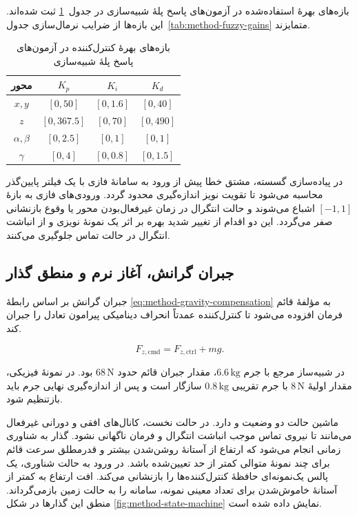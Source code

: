 بازه‌های بهرهٔ استفاده‌شده در آزمون‌های پاسخ پلهٔ شبیه‌سازی در جدول~\ref{tab:method-step-gain-ranges} ثبت شده‌اند. این بازه‌ها از ضرایب نرمال‌سازی جدول~\ref{tab:method-fuzzy-gains} متمایزند.

\begin{table}[!htbp]
	\centering
	\caption{بازه‌های بهرهٔ کنترل‌کننده در آزمون‌های پاسخ پلهٔ شبیه‌سازی}
	\label{tab:method-step-gain-ranges}
	\begin{tabular}{c c c c}
		\hline
		محور & $K_p$ & $K_i$ & $K_d$ \\ \hline
		$x,y$ & $[0,50]$ & $[0,1.6]$ & $[0,40]$ \\
		$z$ & $[0,367.5]$ & $[0,70]$ & $[0,490]$ \\
		$\alpha,\beta$ & $[0,2.5]$ & $[0,1]$ & $[0,1]$ \\
		$\gamma$ & $[0,4]$ & $[0,0.8]$ & $[0,1.5]$ \\ \hline
	\end{tabular}
\end{table}

در پیاده‌سازی گسسته، مشتق خطا پیش از ورود به سامانهٔ فازی با یک فیلتر پایین‌گذر محاسبه می‌شود تا تقویت نویز اندازه‌گیری محدود گردد. ورودی‌های فازی به بازهٔ $[-1,1]$ اشباع می‌شوند و حالت انتگرال در زمان غیرفعال‌بودن محور یا وقوع بازنشانی صفر می‌گردد. این دو اقدام از تغییر شدید بهره بر اثر یک نمونهٔ نویزی و از انباشت انتگرال در حالت تماس جلوگیری می‌کنند.

\subsection{جبران گرانش، آغاز نرم و منطق گذار}
\label{subsec:method-state-machine}

جبران گرانش بر اساس رابطهٔ \ref{eq:method-gravity-compensation} به مؤلفهٔ قائم فرمان افزوده می‌شود تا کنترل‌کننده عمدتاً انحراف دینامیکی پیرامون تعادل را جبران کند.

\begin{equation}
	F_{z,\mathrm{cmd}}=F_{z,\mathrm{ctrl}}+m g.
	\label{eq:method-gravity-compensation}
\end{equation}

در شبیه‌ساز مرجع با جرم $6.6\,\mathrm{kg}$، مقدار جبران قائم حدود $68\,\mathrm N$ بود. در نمونهٔ فیزیکی، مقدار اولیهٔ $8\,\mathrm N$ با جرم تقریبی $0.8\,\mathrm{kg}$ سازگار است و پس از اندازه‌گیری نهایی جرم باید بازتنظیم شود.

ماشین حالت دو وضعیت  و  دارد. در حالت نخست، کانال‌های افقی و دورانی غیرفعال می‌مانند تا نیروی تماس موجب انباشت انتگرال و فرمان ناگهانی نشود. گذار به شناوری زمانی انجام می‌شود که ارتفاع از آستانهٔ روشن‌شدن بیشتر و قدرمطلق سرعت قائم برای چند نمونهٔ متوالی کمتر از حد تعیین‌شده باشد. در ورود به حالت شناوری، یک پالس یک‌نمونه‌ای حافظهٔ کنترل‌کننده‌ها را بازنشانی می‌کند. افت ارتفاع به کمتر از آستانهٔ خاموش‌شدن برای تعداد معینی نمونه، سامانه را به حالت زمین بازمی‌گرداند. منطق این گذارها در شکل \ref{fig:method-state-machine} نمایش داده شده است.

